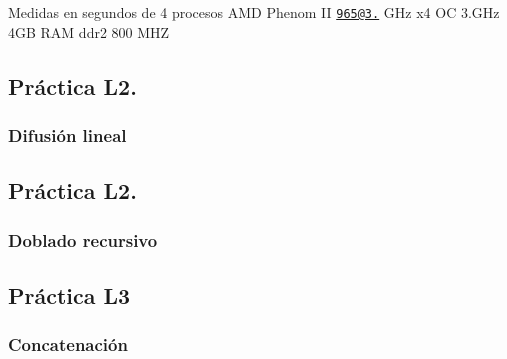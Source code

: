 Medidas en segundos de 4 procesos A\-M\-D Phenom I\-I \href{mailto:965@3.40}{\tt 965@3.} G\-Hz x4 O\-C 3.\-G\-Hz 4\-G\-B R\-A\-M ddr2 800 M\-H\-Z

\subsection*{Práctica L2.}

\subsubsection*{Difusión lineal}

 \subsection*{Práctica L2.}

\subsubsection*{Doblado recursivo}

 \subsection*{Práctica L3}

\subsubsection*{Concatenación}


